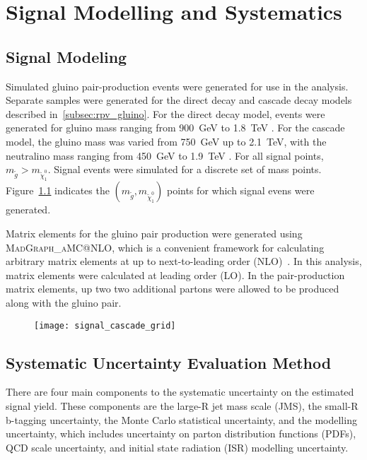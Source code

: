 \chapter{Signal Modelling and Systematics} \label{ch:signal}

\section{Signal Modeling}\label{sec:signal_modeling}

Simulated gluino pair-production events were generated for use in the analysis.
Separate samples were generated for the direct decay and cascade decay models described in~\ref{subsec:rpv_gluino}.
For the direct decay model, events were generated for gluino mass ranging from 900~GeV to 1.8~TeV .
For the cascade model, the gluino mass was varied from 750~GeV up to 2.1~TeV, with the neutralino mass ranging from
450~GeV to 1.9~TeV .
For all signal points, $m_{\tilde{g}} > m_{\tilde{\chi}_1^0}$.
Signal events were simulated for a discrete set of mass points.
Figure~\ref{fig:signal_cascade_grid} indicates the $\left(m_{\tilde{g}}, m_{\tilde{\chi}_1^0}\right)$ points for which
signal evens were generated.

Matrix elements for the gluino pair production were generated using \textsc{MadGraph\_aMC@NLO}, which is a convenient
framework for calculating arbitrary matrix elements at up to next-to-leading order (NLO)~\cite{signal-madgraph}.
In this analysis, matrix elements were calculated at leading order (LO).
In the pair-production matrix elements, up two two additional partons were allowed to be produced along with the
gluino pair.



\begin{figure}[!ht]
    \centering
\texttt{[image: signal\_cascade\_grid]}
\caption{}
\label{fig:signal_cascade_grid}
\end{figure}

\section{Systematic Uncertainty Evaluation Method}\label{sec:signal_systematics_method}
There are four main components to the systematic uncertainty on the
estimated signal yield.
These components are the large-R jet mass scale (JMS), the small-R b-tagging uncertainty, the Monte Carlo statistical
uncertainty, and the modelling uncertainty, which includes uncertainty
on parton distribution functions (PDFs), QCD scale uncertainty, and
initial state radiation (ISR) modelling uncertainty.


